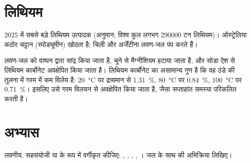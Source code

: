 \section{लिथियम}

\begin{omfigure}

{\small 2025 में सबसे बड़े लिथियम उत्पादक (अनुमान; विश्व कुल
लगभग \num{290000} टन लिथियम)। ऑस्ट्रेलिया कठोर चट्टान
(स्पोड्यूमीन) खोदता है; चिली और अर्जेंटीना लवण-जल पंप करते हैं।}
\end{omfigure}

लवण-जल को वाष्पन द्वारा सांद्र किया जाता है, चूने से मैग्नीशियम हटाया जाता है, और
सोडा ऐश से लिथियम कार्बोनेट अवक्षेपित किया जाता है। लिथियम कार्बोनेट का
असामान्य गुण है कि वह ठंडे की तुलना में गरम में कम विलेय है: \qty{20}{\celsius} पर
द्रव्यमान से \qty{1.31}{\percent}, \qty{80}{\celsius} पर \qty{0.84}{\percent},
\qty{100}{\celsius} पर \qty{0.71}{\percent}। इसलिए उसे
गरम विलयन से अवक्षेपित किया जाता है, जैसा सप्ताहांत समस्या परिकलित करती है।

\section{अभ्यास}

\begin{exercise}[$\star$]\label{exo:b1:s-block:1}
लवणीय, सहसंयोजी या  के रूप में वर्गीकृत कीजिए: , ,
, , । जल के साथ  की अभिक्रिया लिखिए।
\end{exercise}

